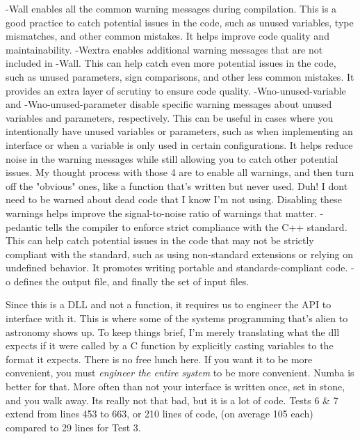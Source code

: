 \documentclass[%
 reprint,
 amsmath,amssymb,
 aps,
showkeys,
]{revtex4-2}
\begin{document}
-Wall enables all the common warning messages during compilation. This is a good practice to catch potential issues in the code, such as unused variables, type mismatches, and other common mistakes. It helps improve code quality and maintainability.
-Wextra enables additional warning messages that are not included in -Wall. This can help catch even more potential issues in the code, such as unused parameters, sign comparisons, and other less common mistakes. It provides an extra layer of scrutiny to ensure code quality.
-Wno-unused-variable and -Wno-unused-parameter disable specific warning messages about unused variables and parameters, respectively. This can be useful in cases where you intentionally have unused variables or parameters, such as when implementing an interface or when a variable is only used in certain configurations. It helps reduce noise in the warning messages while still allowing you to catch other potential issues.
My thought process with those 4 are to enable all warnings, and then turn off the "obvious" ones, like a function that's written but never used. Duh! I dont need to be warned about dead code that I know I'm not using. Disabling these warnings helps improve the signal-to-noise ratio of warnings that matter.
-pedantic tells the compiler to enforce strict compliance with the C++ standard. This can help catch potential issues in the code that may not be strictly compliant with the standard, such as using non-standard extensions or relying on undefined behavior. It promotes writing portable and standards-compliant code.
-o defines the output file, and finally the set of input files.

Since this is a DLL and not a function, it requires us to engineer the API to interface with it. This is where some of the systems programming that's alien to astronomy shows up. To keep things brief, I'm merely translating what the dll expects if it were called by a C function by explicitly casting variables to the format it expects. There is no free lunch here. If you want it to be more convenient, you must \textit{engineer the entire system} to be more convenient. Numba is better for that. More often than not your interface is written once, set in stone, and you walk away. Its really not that bad, but it is a lot of code. Tests 6 & 7 extend from lines 453 to 663, or 210 lines of code, (on average 105 each) compared to 29 lines for Test 3.
\end{document}
